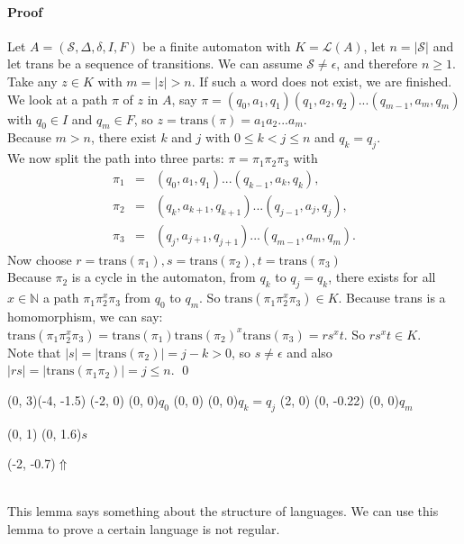 \documentclass{article}
\begin{document}
\paragraph{Proof}
Let $A = (\mathcal{S}, \Delta, \delta, I, F)$ be a finite automaton with
$K = \mathcal{L}(A)$, let $n = |\mathcal{S}|$ and let trans be a sequence of
transitions. We can assume $\mathcal{S} \ne \epsilon$, and therefore
$n \ge 1$.\\
Take any $z \in K$ with $m = |z| > n$. If such a word does not exist, we are
finished. We look at a path $\pi$ of $z$ in $A$, say
$\pi = (q_0, a_1, q_1)(q_1, a_2, q_2)...(q_{m - 1}, a_m, q_m)$ with
$q_0 \in I$ and $q_m \in F$, so $z = \mathrm{trans}(\pi) = a_1a_2...a_m$.\\
Because $m > n$, there exist $k$ and $j$ with $0 \le k < j \le n$ and
$q_k = q_j$.\\
We now split the path into three parts: $\pi = \pi_1 \pi_2 \pi_3$ with
\begin{eqnarray*}
  \pi_1 &=& (q_0, a_1, q_1) ... (q_{k - 1}, a_k, q_k),\\
  \pi_2 &=& (q_k, a_{k + 1}, q_{k + 1}) ... (q_{j - 1}, a_j, q_j),\\
  \pi_3 &=& (q_j, a_{j + 1}, q_{j + 1}) ... (q_{m - 1}, a_m, q_m).
\end{eqnarray*}
Now choose $r = \mathrm{trans}(\pi_1), s = \mathrm{trans}(\pi_2),
            t = \mathrm{trans}(\pi_3)$\\
Because $\pi_2$ is a cycle in the automaton, from $q_k$ to $q_j = q_k$, there
exists for all $x \in \mathbb{N}$ a path $\pi_1 \pi_2^x \pi_3$ from $q_0$ to
$q_m$. So $\mathrm{trans}(\pi_1 \pi_2^x \pi_3) \in K$. Because trans is a
homomorphism, we can say:  $\mathrm{trans}(\pi_1 \pi_2^x \pi_3) =
\mathrm{trans}(\pi_1) \mathrm{trans}(\pi_2)^x \mathrm{trans}(\pi_3) = r s^x t$.
So $r s^x t \in K$.\\
Note that $|s| = |\mathrm{trans}(\pi_2)| = j - k > 0$, so $s \ne \epsilon$
and also $|rs| = |\mathrm{trans}(\pi_1 \pi_2)| = j \le n$. \qed\\
\begin{graph}(0, 3)(-4, -1.5)
  (-2, 0) (0, 0){\bs$q_0$\es}
  (0, 0) (0, 0){\bS$q_k=q_j$\eS}
  (2, 0)
    (0, -0.22){} (0, 0){\bs$q_m$\es}

   
  (0, 1) \freetext(0, 1.6){$s$}
   

  \freetext(-2, -0.7){$\Uparrow$}
\end{graph}\\
This lemma says something about the structure of languages. We can use this
lemma to prove a certain language is not regular.
\end{document}
